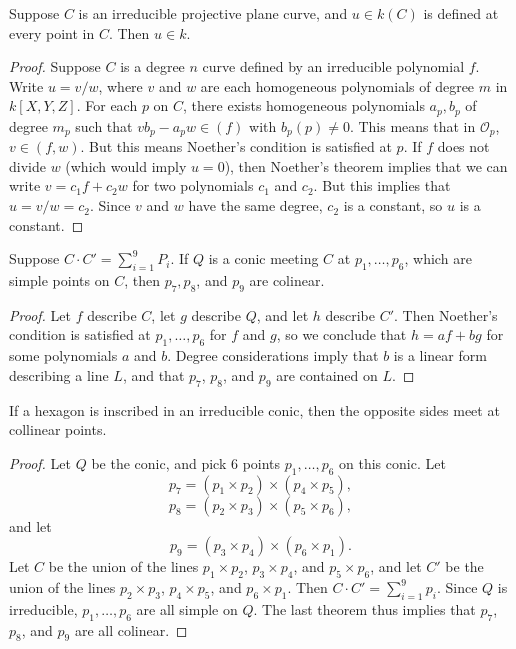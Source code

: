 \begin{theorem}
    Suppose $C$ is an irreducible projective plane curve, and $u \in k(C)$ is defined at every point in $C$. Then $u \in k$.
\end{theorem}
\begin{proof}
    Suppose $C$ is a degree $n$ curve defined by an irreducible polynomial $f$. Write $u = v/w$, where $v$ and $w$ are each homogeneous polynomials of degree $m$ in $k[X,Y,Z]$. For each $p$ on $C$, there exists homogeneous polynomials $a_p,b_p$ of degree $m_p$ such that $vb_p - a_pw \in (f)$ with $b_p(p) \neq 0$. This means that in $\mathcal{O}_p$, $v \in (f,w)$. But this means Noether's condition is satisfied at $p$. If $f$ does not divide $w$ (which would imply $u = 0$), then Noether's theorem implies that we can write $v = c_1f + c_2w$ for two polynomials $c_1$ and $c_2$. But this implies that $u = v/w = c_2$. Since $v$ and $w$ have the same degree, $c_2$ is a constant, so $u$ is a constant.
\end{proof}

\begin{theorem}
    Suppose $C \cdot C' = \sum_{i = 1}^9 P_i$. If $Q$ is a conic meeting $C$ at $p_1, \dots, p_6$, which are simple points on $C$, then $p_7, p_8$, and $p_9$ are colinear.
\end{theorem}
\begin{proof}
    Let $f$ describe $C$, let $g$ describe $Q$, and let $h$ describe $C'$. Then Noether's condition is satisfied at $p_1,\dots,p_6$ for $f$ and $g$, so we conclude that $h = af + bg$ for some polynomials $a$ and $b$. Degree considerations imply that $b$ is a linear form describing a line $L$, and that $p_7$, $p_8$, and $p_9$ are contained on $L$.
\end{proof}

\begin{corollary}
    If a hexagon is inscribed in an irreducible conic, then the opposite sides meet at collinear points.
\end{corollary}
\begin{proof}
    Let $Q$ be the conic, and pick 6 points $p_1,\dots,p_6$ on this conic. Let
    \[ p_7 = (p_1 \times p_2) \times (p_4 \times p_5), \]
    \[ p_8 = (p_2 \times p_3) \times (p_5 \times p_6), \]
    and let
    \[ p_9 = (p_3 \times p_4) \times (p_6 \times p_1). \]
    Let $C$ be the union of the lines $p_1 \times p_2$, $p_3 \times p_4$, and $p_5 \times p_6$, and let $C'$ be the union of the lines $p_2 \times p_3$, $p_4 \times p_5$, and $p_6 \times p_1$. Then $C \cdot C' = \sum_{i = 1}^9 p_i$. Since $Q$ is irreducible, $p_1,\dots,p_6$ are all simple on $Q$. The last theorem thus implies that $p_7$, $p_8$, and $p_9$ are all colinear.
\end{proof}

